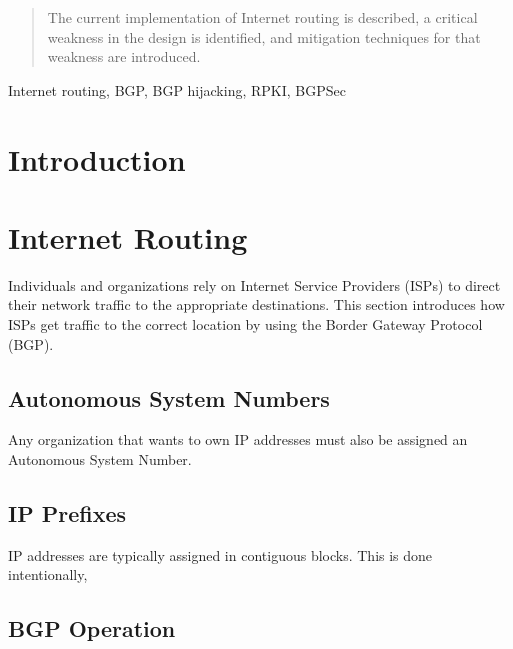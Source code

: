 \documentclass[conference]{IEEEtran}
\begin{document}
\title{}

\author{
}

\maketitle

\begin{abstract}
The current implementation of Internet routing is described, a critical
weakness in the design is identified, and mitigation techniques for that
weakness are introduced.
\end{abstract}

\begin{IEEEkeywords}
Internet routing, BGP, BGP hijacking, RPKI, BGPSec
\end{IEEEkeywords}

\section{Introduction}


\section{Internet Routing}
Individuals and organizations rely on Internet Service Providers (ISPs) to
direct their network traffic to the appropriate destinations.  This section
introduces how ISPs get traffic to the correct location by using the Border 
Gateway Protocol (BGP).

\subsection{Autonomous System Numbers}
Any organization that wants to own IP addresses must also be assigned an
Autonomous System Number.

\subsection{IP Prefixes}
IP addresses are typically assigned in contiguous blocks.  This is done
intentionally,

\subsection{BGP Operation}
\end{document}
